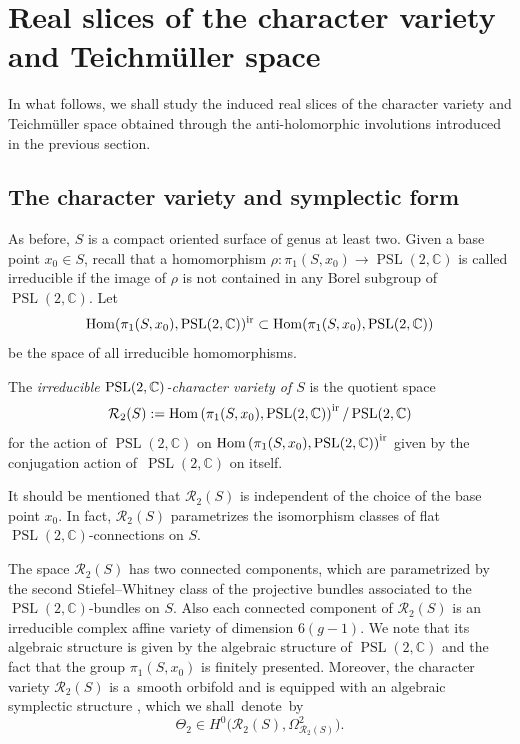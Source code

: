 \documentclass[10pt,a4paper]{amsart}
\numberwithin{equation}{section}
\begin{document}
\section{Real slices of the character variety and Teichm\"uller space}

In what follows, we shall study the induced real slices of the character variety and Teichm\"uller space obtained through the
anti-holomorphic involutions introduced in the previous section.

\subsection{The character variety and symplectic form}

As before, $S$ is a compact oriented surface of genus at least two.
Given a base point $x_0 \in S$, recall that a homomorphism $\rho\colon \pi_1(S, x_0) \longrightarrow
\operatorname{PSL}(2,{\mathbb C})$ is called irreducible if the image of $\rho$ is not contained in any
Borel subgroup of $\operatorname{PSL}(2,{\mathbb C})$.
Let
\[
\operatorname{Hom}(\pi_1(S, x_0), \operatorname{PSL}(2,{\mathbb C}))^{\rm ir} \subset
\operatorname{Hom}(\pi_1(S, x_0), \operatorname{PSL}(2,{\mathbb C}))
\]
be the space of all irreducible homomorphisms.

\begin{Definition}
The {\it irreducible ${\rm PSL}(2,{\mathbb C})$-character variety of $S$} is the quotient space
\begin{equation}\label{e11}
{\mathcal R}_2(S) := \operatorname{Hom}\left(\pi_1(S, x_0), \operatorname{PSL}(2,{\mathbb C})\right)^{\rm ir}/\operatorname{PSL}(2,{\mathbb C})
\end{equation}
for the action of $\operatorname{PSL}(2,{\mathbb C})$ on $\operatorname{Hom}\left(\pi_1(S, x_0), \operatorname{PSL}(2,{\mathbb
C})\right)^{\rm ir}$ given by the conjugation action of~$\operatorname{PSL}(2,{\mathbb C})$ on itself.
\end{Definition}

It should be mentioned that ${\mathcal R}_2(S)$ is independent of the choice of the base point $x_0$.
In fact, ${\mathcal R}_2(S)$ parametrizes the isomorphism classes of flat $\operatorname{PSL}(2,{\mathbb C})$-connections
on $S$.

The space ${\mathcal R}_2(S)$ has two connected components, which are parametrized
by the second Stiefel--Whitney class of the projective bundles associated to the
$\operatorname{PSL}(2,{\mathbb C})$-bundles on $S$. Also each connected component
of ${\mathcal R}_2(S)$ is an irreducible complex affine
variety of dimension $6(g-1)$. We note that its algebraic structure is given by the algebraic structure of
$\operatorname{PSL}(2,{\mathbb C})$ and the fact that the group $\pi_1(S, x_0)$ is
finitely presented. Moreover, the character variety ${\mathcal R}_2(S)$ is a~smooth orbifold
and is equipped with an algebraic symplectic structure \cite{ AB, Go}, which we shall~denote~by
\begin{equation}\label{e13}
\Theta_2 \in H^0\bigl({\mathcal R}_2(S), \Omega^2_{{\mathcal R}_2(S)}\bigr).
\end{equation}
\end{document}
